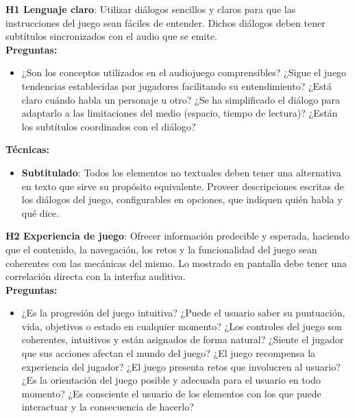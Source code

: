 	\textbf{H1 Lenguaje claro}: Utilizar diálogos sencillos y claros para que las instrucciones del juego sean fáciles de entender. Dichos diálogos deben tener subtítulos sincronizados con el audio que se emite. \cite{EN301549-2021} \cite{jimenezhurtadoDimensionsSubdimensionsEQUIT2025} \cite{teixeiraborgesFairPlayGuidelines2018a}\\
	\textbf{Preguntas:}
\begin{itemize}
		\item ¿Son los conceptos utilizados en el audiojuego comprensibles? ¿Sigue el juego tendencias establecidas por jugadores facilitando su entendimiento? ¿Está claro cuándo habla un personaje u otro? ¿Se ha simplificado el diálogo para adaptarlo a las limitaciones del medio (espacio, tiempo de lectura)? ¿Están los subtítulos coordinados con el diálogo?
\end{itemize}
	\textbf{Técnicas:}
	\begin{itemize}
		\item \textbf{Subtitulado}: Todos los elementos no textuales deben tener una alternativa en texto que sirve su propósito equivalente. Proveer descripciones escritas de los diálogos del juego, configurables en opciones, que indiquen quién habla y qué dice. \cite{WebContentAccessibility}
	\end{itemize}
	\textbf{H2 Experiencia de juego}: Ofrecer información predecible y esperada, haciendo que el contenido, la navegación, los retos y la funcionalidad del juego sean coherentes con las mecánicas del mismo. Lo mostrado en pantalla debe tener una correlación directa con la interfaz auditiva. \cite{falkEngagingGameplayAudio2020} \cite{deborbacamposUsabilityAccessibilityGameplay2016} \cite{EN301549-2021} \cite{jimenezhurtadoDimensionsSubdimensionsEQUIT2025} \cite{teixeiraborgesFairPlayGuidelines2018a}\\
\textbf{Preguntas:}
\begin{itemize}
	\item ¿Es la progresión del juego intuitiva? ¿Puede el usuario saber su puntuación, vida, objetivos o estado en cualquier momento? ¿Los controles del juego son coherentes, intuitivos y están asignados de forma natural? ¿Siente el jugador que sus acciones afectan el mundo del juego? ¿El juego recompensa la experiencia del jugador? ¿El juego presenta retos que involucren al usuario? ¿Es la orientación del juego posible y adecuada para el usuario en todo momento? ¿Es consciente el usuario de los elementos con los que puede interactuar y la consecuencia de hacerlo? 
\end{itemize}
